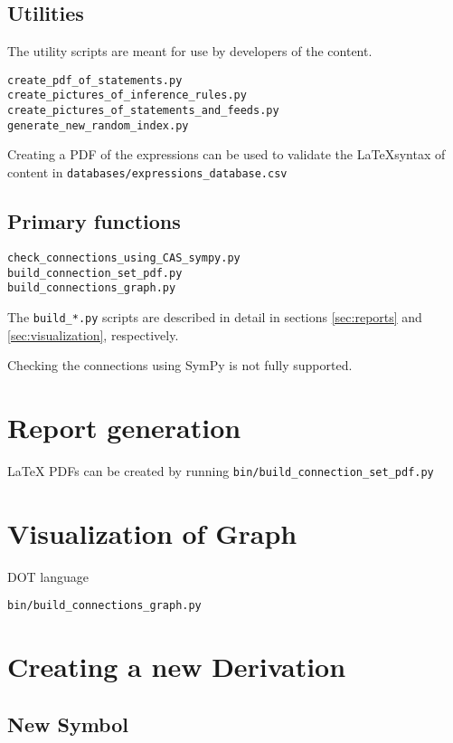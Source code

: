 \documentclass{article}
\begin{document}
\begin{multicols}{2}
\subsection{Utilities}
The utility scripts are meant for use by developers of the content. 
\begin{verbatim}
create_pdf_of_statements.py
create_pictures_of_inference_rules.py
create_pictures_of_statements_and_feeds.py
generate_new_random_index.py
\end{verbatim}
Creating a PDF of the expressions can be used to validate the \LaTeX syntax of content in \texttt{databases/expressions\_database.csv}

\subsection{Primary functions}

\begin{verbatim}
check_connections_using_CAS_sympy.py
build_connection_set_pdf.py
build_connections_graph.py
\end{verbatim}

The \texttt{build\_*.py} scripts are described in detail in sections \ref{sec:reports} and \ref{sec:visualization}, respectively. 

Checking the connections using SymPy is not fully supported. 

\section{Report generation\label{sec:reports}}

\LaTeX\cite{1994_Latex} PDFs can be created by running \texttt{bin/build\_connection\_set\_pdf.py}

\section{Visualization of Graph\label{sec:visualization}}

DOT language\cite{2015_Graphviz} 

\texttt{bin/build\_connections\_graph.py}

\section{Creating a new Derivation\label{sec:new_derivation}}

\subsection{New Symbol\label{sec:new_symbol}}


\end{multicols}
\end{document}
